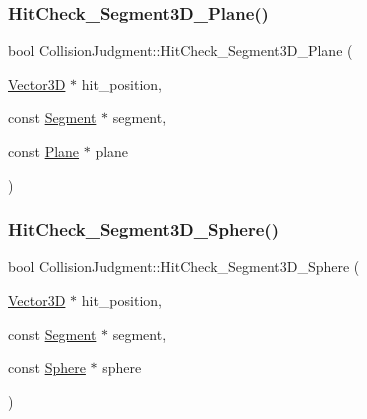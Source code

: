 \mbox{\label{class_collision_judgment_ac31167bc6d89d20f7220220ee3f21f4e}} 
\subsubsection{\texorpdfstring{Hit\+Check\+\_\+\+Segment3\+D\+\_\+\+Plane()}{HitCheck\_Segment3D\_Plane()}}
{\footnotesize\ttfamily bool Collision\+Judgment\+::\+Hit\+Check\+\_\+\+Segment3\+D\+\_\+\+Plane (\begin{DoxyParamCaption}\item[{\mbox{\hyperlink{class_vector3_d}{Vector3D}} $\ast$}]{hit\+\_\+position,  }\item[{const \mbox{\hyperlink{class_segment}{Segment}} $\ast$}]{segment,  }\item[{const \mbox{\hyperlink{class_plane}{Plane}} $\ast$}]{plane }\end{DoxyParamCaption})\hspace{0.3cm}{\ttfamily [static]}}

\mbox{\label{class_collision_judgment_a92531c1254846a0a06ee7e95796f1070}} 
\subsubsection{\texorpdfstring{Hit\+Check\+\_\+\+Segment3\+D\+\_\+\+Sphere()}{HitCheck\_Segment3D\_Sphere()}}
{\footnotesize\ttfamily bool Collision\+Judgment\+::\+Hit\+Check\+\_\+\+Segment3\+D\+\_\+\+Sphere (\begin{DoxyParamCaption}\item[{\mbox{\hyperlink{class_vector3_d}{Vector3D}} $\ast$}]{hit\+\_\+position,  }\item[{const \mbox{\hyperlink{class_segment}{Segment}} $\ast$}]{segment,  }\item[{const \mbox{\hyperlink{class_sphere}{Sphere}} $\ast$}]{sphere }\end{DoxyParamCaption})\hspace{0.3cm}{\ttfamily [static]}}

